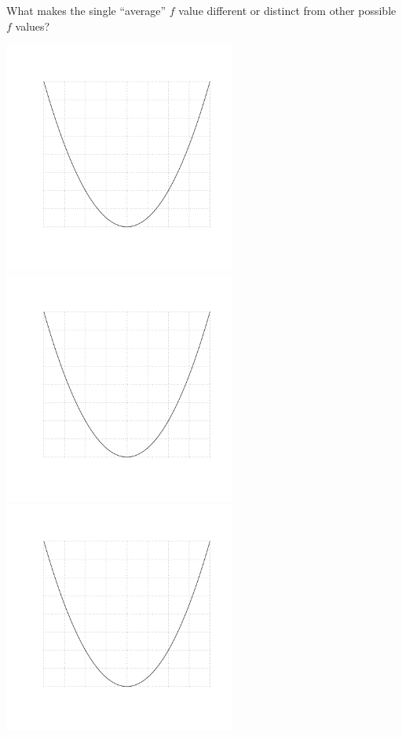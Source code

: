 \newpage

\problem What makes the single ``average'' $f$ value different or
  distinct from other possible $f$ values?


\includegraphics[width=3in]{graphics/notes_06_quadratic}\hfill
\includegraphics[width=3in]{graphics/notes_06_quadratic}\hfill
\includegraphics[width=3in]{graphics/notes_06_quadratic}

